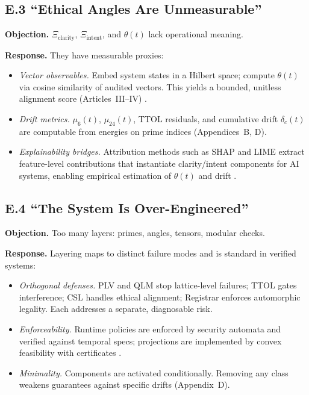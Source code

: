 \documentclass[12pt]{amsart}
\theoremstyle{plain}
\begin{document}
\subsection*{E.3 “Ethical Angles Are Unmeasurable”}

\textbf{Objection.} $\Xi_{\text{clarity}}$, $\Xi_{\text{intent}}$, and $\theta(t)$ lack operational meaning.

\textbf{Response.} They have measurable proxies:
\begin{itemize}
  \item \textit{Vector observables.} Embed system states in a Hilbert space; compute $\theta(t)$ via cosine similarity of audited vectors. This yields a bounded, unitless alignment score (Articles~III–IV) \cite{rudin1991functional,lax2002functional}.
  \item \textit{Drift metrics.} $\mu_6(t)$, $\mu_{24}(t)$, TTOL residuals, and cumulative drift $\delta_c(t)$ are computable from energies on prime indices (Appendices~B, D).
  \item \textit{Explainability bridges.} Attribution methods such as SHAP and LIME extract feature-level contributions that instantiate clarity/intent components for AI systems, enabling empirical estimation of $\theta(t)$ and drift \cite{lundberg2017unified,ribeiro2016should}.
\end{itemize}

\subsection*{E.4 “The System Is Over-Engineered”}

\textbf{Objection.} Too many layers: primes, angles, tensors, modular checks.

\textbf{Response.} Layering maps to distinct failure modes and is standard in verified systems:
\begin{itemize}
  \item \textit{Orthogonal defenses.} PLV and QLM stop lattice-level failures; TTOL gates interference; CSL handles ethical alignment; Registrar enforces automorphic legality. Each addresses a separate, diagnosable risk.
  \item \textit{Enforceability.} Runtime policies are enforced by security automata and verified against temporal specs; projections are implemented by convex feasibility with certificates \cite{schneider2000enforceable,clarke1999model,baier2008model,boyd2004convex}.
  \item \textit{Minimality.} Components are activated conditionally. Removing any class weakens guarantees against specific drifts (Appendix~D).
\end{itemize}
\end{document}
